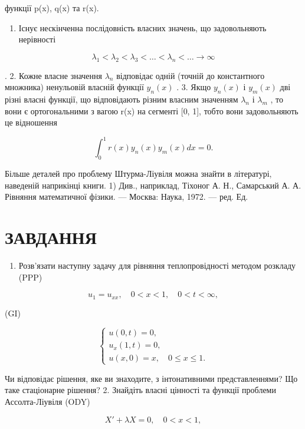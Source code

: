 \documentclass[
  ukrainian,
]{article}
\providecommand{\tightlist}{%
  \setlength{\itemsep}{0pt}\setlength{\parskip}{0pt}}
\begin{document}
функції p(x), q(x) та r(x).

\begin{enumerate}
\def\labelenumi{\arabic{enumi}.}
\tightlist
\item
  Існує нескінченна послідовність власних значень, що задовольняють
  нерівності
\end{enumerate}

\[
\lambda_1 < \lambda_2 < \lambda_3 < \ldots < \lambda_n < \ldots \to \infty
\]

. 2. Кожне власне значення \(\lambda_n\) відповідає одній (точній до
константного множника) ненульовій власній функції \(y_n(x)\) . 3. Якщо
\(y_n(x)\) і \(y_m(x)\) дві різні власні функції, що відповідають різним
власним значенням \(\lambda_n\) і \(\lambda_m\) , то вони є
ортогональними з вагою r(x) на сегменті {[}0, 1{]}, тобто вони
задовольняють це відношення

\[
\int_{0}^{1} r(x) y_{n}(x) y_{m}(x) dx = 0.
\]

Більше деталей про проблему Штурма-Ліувіля можна знайти в літературі,
наведеній наприкінці книги. 1) Див., наприклад, Тіхоног А. Н.,
Самарський А. А. Рівняння математичної фізики. --- Москва: Наука, 1972.
--- ред. Ед.

\section{ЗАВДАННЯ}\label{ux437ux430ux432ux434ux430ux43dux43dux44f-6}

\begin{enumerate}
\def\labelenumi{\arabic{enumi}.}
\tightlist
\item
  Розв'язати наступну задачу для рівняння теплопровідності методом
  розкладу (PPP)
\end{enumerate}

\[
u_1 = u_{xx}, \quad 0 < x < 1, \quad 0 < t < \infty,
\]

(GI)

\[
\begin{cases} u(0, t) = 0, \\ u_x(1, t) = 0, \\ u(x, 0) = x, \quad 0 \le x \le 1. \end{cases}
\]

Чи відповідає рішення, яке ви знаходите, з інтонативними
представленнями? Що таке стаціонарне рішення? 2. Знайдіть власні
цінності та функції проблеми Ассолта-Ліувіля (ODY)

\[
X' + \lambda X = 0, \quad 0 < x < 1,
\]
\end{document}
